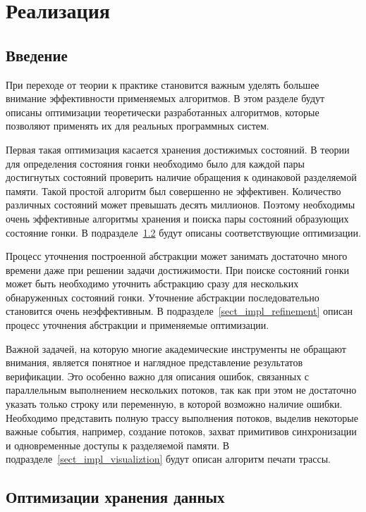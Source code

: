 \chapter{Реализация}
\label{chapter_implementation}

\section{Введение} \label{sect_impl_introduction}

При переходе от теории к практике становится важным уделять большее внимание эффективности применяемых алгоритмов.
В этом разделе будут описаны оптимизации теоретически разработанных алгоритмов, которые позволяют применять их для реальных программных систем. 

Первая такая оптимизация касается хранения достижимых состояний. В теории для определения состояния гонки необходимо было для каждой пары достигнутых состояний проверить наличие обращения к одинаковой разделяемой памяти. Такой простой алгоритм был совершенно не эффективен. Количество различных состояний может превышать десять миллионов. Поэтому необходимы очень эффективные алгоритмы хранения и поиска пары состояний образующих состояние гонки. В подразделе~\ref{sect_impl_storage} будут описаны соответствующие оптимизации.

Процесс уточнения построенной абстракции может занимать достаточно много времени даже при решении задачи достижимости. При поиске состояний гонки может быть необходимо уточнить абстракцию сразу для нескольких обнаруженных состояний гонки. Уточнение абстракции последовательно становится очень неэффективным. В подразделе~\ref{sect_impl_refinement} описан процесс уточнения абстракции и применяемые оптимизации.

Важной задачей, на которую многие академические инструменты не обращают внимания, является понятное и наглядное представление результатов верификации. Это особенно важно для описания ошибок, связанных с параллельным выполнением нескольких потоков, так как при этом не достаточно указать только строку или переменную, в которой возможно наличие ошибки. Необходимо представить полную трассу выполнения потоков, выделив некоторые важные события, например, создание потоков, захват примитивов синхронизации и одновременные доступы к разделяемой памяти. В подразделе~\ref{sect_impl_visualiztion} будут описан алгоритм печати трассы.

\section{Оптимизации хранения данных} \label{sect_impl_storage}

